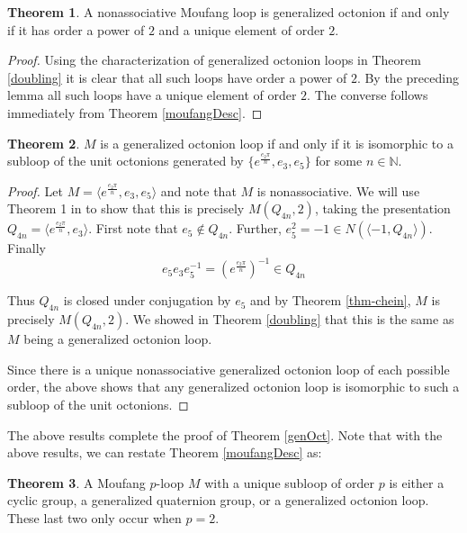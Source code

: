 \documentclass[12pt]{report}
\theoremstyle{definition}
\newtheorem{thm}{Theorem}[chapter]
\newcommand{\NNN}{\mathbb{N}}
\begin{document}
\begin{thm}
	A nonassociative Moufang loop is generalized octonion if and only if it has order a power of $2$ and
    a unique element of order $2$.
\end{thm}

\begin{proof}
	Using the characterization of generalized octonion loops in Theorem \ref{doubling} it is clear that
    all such loops have order a power of $2$. By the preceding lemma all such loops have a unique element
    of order $2$. The converse follows immediately from Theorem \ref{moufangDesc}.
\end{proof}

\begin{thm}
	$M$ is a generalized octonion loop if and only if it is isomorphic to a subloop of the unit octonions
    generated by $\{e^{\frac{e_2\pi}{n}}, e_3, e_5\}$ for some $n\in\NNN$.
\end{thm}

\begin{proof}
  Let $M = \langle e^{\frac{e_2\pi}{n}}, e_3, e_5\rangle$ and note that $M$ is nonassociative. We will use
    Theorem 1 in \cite{Chein} to show that this is precisely $M(Q_{4n}, 2)$, taking the presentation
    $Q_{4n}  = \langle e^{\frac{e_2\pi}{n}}, e_3\rangle$. First note that $e_5\notin Q_{4n}$. Further,
    $e_5^2 = -1\in N(\langle -1, Q_{4n}\rangle)$. Finally
	\[e_5 e_3 e_5^{-1} = (e^{\frac{e_2\pi}{n}})^{-1}\in Q_{4n}\]

  Thus $Q_{4n}$ is closed under conjugation by $e_5$ and by Theorem \ref{thm-chein}, $M$ is precisely
    $M(Q_{4n}, 2)$. We showed in Theorem \ref{doubling} that this is the same as $M$ being a generalized
    octonion loop.

	Since there is a unique nonassociative generalized octonion loop of each possible order, the above
    shows that any generalized octonion loop is isomorphic to such a subloop of the unit octonions.
\end{proof}

The above results complete the proof of Theorem \ref{genOct}. Note that with the above results, we can
  restate Theorem \ref{moufangDesc} as:

\begin{thm}
	A Moufang $p$-loop $M$ with a unique subloop of order $p$ is either a cyclic group, a generalized
    quaternion group, or a generalized octonion loop. These last two only occur when $p = 2$.
\end{thm}
\end{document}
